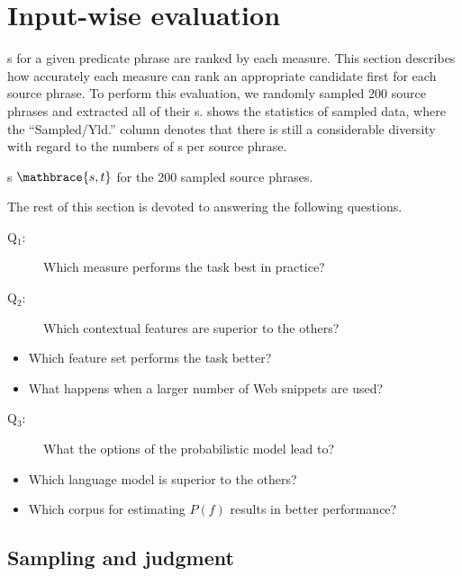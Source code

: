 \documentclass[english]{jnlp_1.4}
\begin{document}
\section{Input-wise evaluation}
\label{sec:eval-gen}

{\Pc}s for a given predicate phrase are ranked by each measure.  This
section describes how accurately each measure can rank an appropriate
candidate first for each source phrase.
To perform this evaluation, we randomly sampled 200 source phrases and
extracted all of their {\pc}s.   shows the
statistics of sampled data, where the ``Sampled/Yld.'' column denotes
that there is still a considerable diversity with regard to the
numbers of {\pc}s per source phrase.

\begin{table}[t]
\caption{{\Pcp}s $\mathbrace{s,t}$ for the 200 sampled source phrases.}
\label{tab:sample-generated}

\end{table}

The rest of this section is devoted to answering the following
questions.
\begin{description}
\item[Q$_{1}$:] Which measure performs the task best in practice?
\item[Q$_{2}$:] Which contextual features are superior to the others?
\end{description}
\begin{itemize}
\item Which feature set performs the task better?
\item What happens when a larger number of Web snippets are used?
\end{itemize}
\begin{description}
\item[Q$_{3}$:] What the options of the probabilistic model lead to?
\end{description}
\begin{itemize}
\item Which language model is superior to the others?
\item Which corpus for estimating $P(f)$ results in better
  performance?
\end{itemize}

\subsection{Sampling and judgment}
\label{ssec:gen-sampling}
\end{document}
